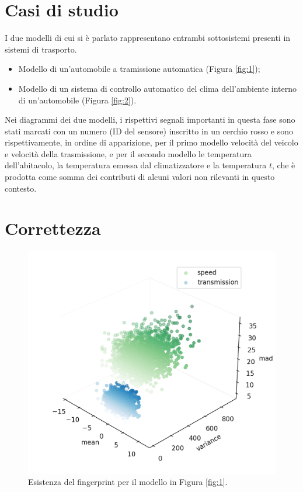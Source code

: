 \documentclass[Lau,binding=0.6cm]{sapthesis}
\begin{document}
\newpage
\section{Casi di studio}
I due modelli di cui si \`e parlato rappresentano entrambi sottosistemi presenti in sistemi di trasporto.
\begin{itemize}
    \item Modello di un'automobile a tramissione automatica (Figura \ref{fig:1});
    \item Modello di un sistema di controllo automatico del clima dell'ambiente interno di un'automobile (Figura \ref{fig:2}).
\end{itemize}
Nei diagrammi dei due modelli, i rispettivi segnali importanti in questa fase sono stati marcati con un numero (ID del sensore) inscritto in un cerchio rosso e sono rispettivamente, 
in ordine di apparizione, per il primo modello velocit\`a del veicolo e velocit\`a della trasmissione, e per il secondo modello le temperatura dell'abitacolo, la temperatura emessa dal climatizzatore e la temperatura $t$, che \`e prodotta come somma dei contributi di alcuni valori non rilevanti in questo contesto.

\section{Correttezza}
\begin{figure}[t]
    \includegraphics[scale=0.6]{fingerprint.png}
    \centering
    \caption{Esistenza del fingerprint per il modello in Figura \ref{fig:1}.}
    \label{fig:3}
\end{figure}
\end{document}
